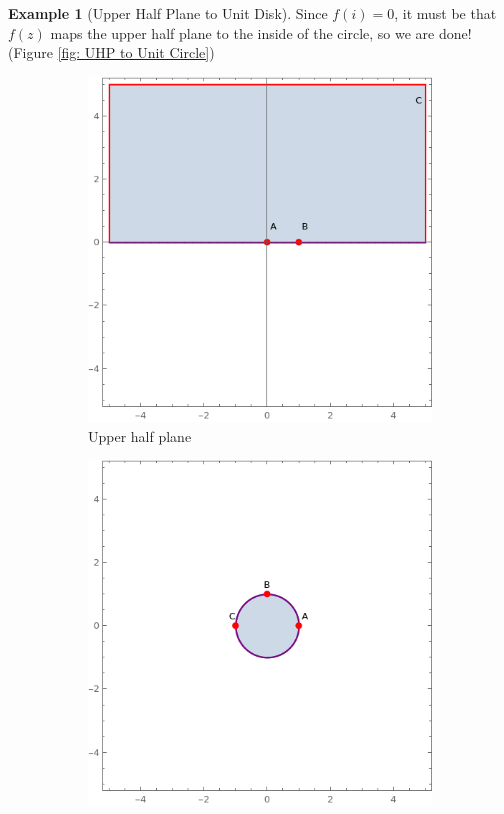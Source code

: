 \documentclass[a4paper, 12pt]{article}
\theoremstyle{definition}
\newtheorem{example}{Example}
\numberwithin{theorem}{section}
\numberwithin{definition}{section}
\numberwithin{exercise}{section}
\numberwithin{remark}{section}
\numberwithin{figure}{section}
\numberwithin{example}{section}
\begin{document}
\begin{example}[Upper Half Plane to Unit Disk]
    Since $f(i) = 0$, it must be that $f(z)$ maps the upper half plane to the inside of the circle, so we are done!
    (Figure \ref{fig: UHP to Unit Circle})
    \begin{figure}[tbp]
        \centering
        \begin{subfigure}[b]{0.5\textwidth}
            \centering
            \includegraphics[width=\textwidth]{UpperHalfPlane}
            \caption{Upper half plane}
        \end{subfigure}
        \hfill
        \begin{subfigure}[b]{0.5\textwidth}
            \centering
            \includegraphics[width=\textwidth]{UnitCircle}

\end{subfigure}
\end{figure}
\end{example}
\end{document}
